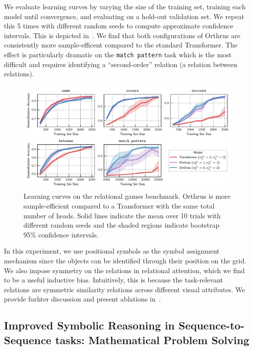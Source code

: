 We evaluate learning curves by varying the size of the training set, training each model until convergence, and evaluating on a hold-out validation set. We repeat this 5 times with different random seeds to compute approximate confidence intervals. This is depicted in~. We find that both configurations of Orthrus are consistently more sample-efficent compared to the standard Transformer. The effect is particularly dramatic on the \texttt{match pattern} task which is the most difficult and requires identifying a ``second-order'' relation (a relation between relations).

\begin{figure}
    \includegraphics[width=\textwidth]{figs/experiments/relgames/relgames_learning_curves.pdf}
    \caption{Learning curves on the relational games benchmark. Orthrus is more sample-efficient compared to a Transformer with the same total number of heads. Solid lines indicate the mean over 10 trials with different random seeds and the shaded regions indicate bootstrap 95\% confidence intervals.}\label{fig:relgames_learning_curves}
\end{figure}

In this experiment, we use positional symbols as the symbol assignment mechanism since the objects can be identified through their position on the grid. We also impose symmetry on the relations in relational attention, which we find to be a useful inductive bias. Intuitively, this is because the task-relevant relations are symmetric similarity relations across different visual attributes. We provide furhter discussion and present ablations in~.


\subsection{Improved Symbolic Reasoning in Sequence-to-Sequence tasks: Mathematical Problem Solving}\label{ssec:math}

